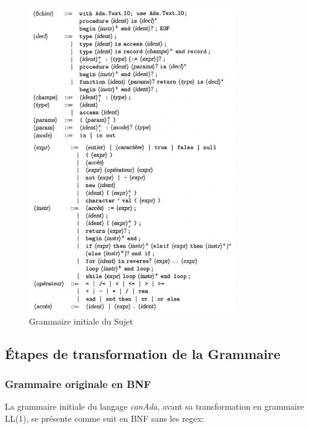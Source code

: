\documentclass[french,a4paper]{article}
\begin{document}
    \begin{figure}[H]
        \centering
        \includegraphics[width=0.8\textwidth]{grammaire_init}
        \caption{Grammaire initiale du Sujet}\label{fig:figure}
    \end{figure}

    \subsection{Étapes de transformation de la Grammaire}\label{subsec:etapes-de-transformation-de-la-grammaire}

    \subsubsection{Grammaire originale en BNF}\label{subsec:grammaire-originale-en-bnf}

    La grammaire initiale du langage \textit{canAda}, avant sa transformation en grammaire LL(1), se présente comme suit en BNF sans les regex:
\end{document}
